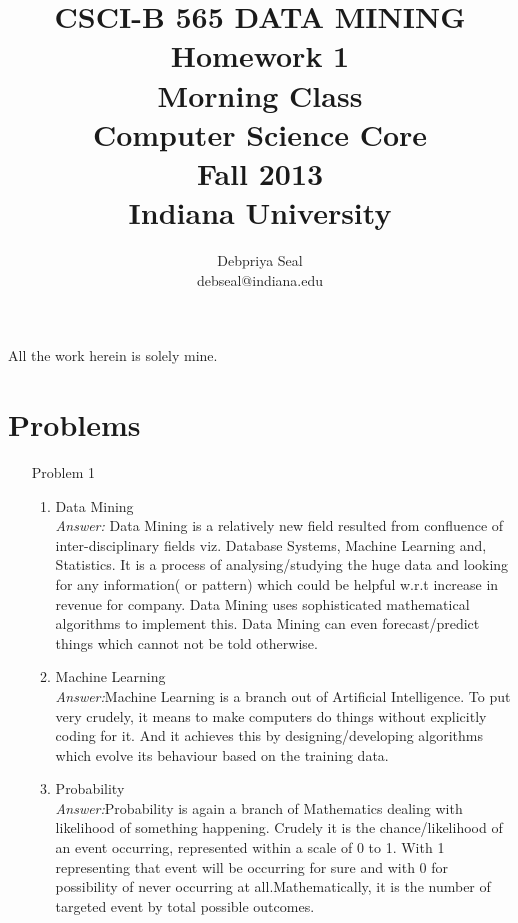 \documentclass{article}
\begin{document}
\title{ CSCI-B 565 DATA MINING \\
Homework 1 \\
Morning Class\\
Computer Science Core\\Fall 2013\\Indiana University}
\author{ Debpriya Seal\\ debseal@indiana.edu}
\maketitle
All the work herein is solely mine.
\section*{Problems}

\begin{enumerate}
	\item[Problem] 1  
		\begin{enumerate}
			
			\item Data Mining \\
			\emph{Answer:} Data Mining is a relatively new field resulted from confluence of inter-disciplinary fields viz. Database Systems, Machine Learning and, Statistics. It is a process of analysing/studying the huge data and looking for any information( or pattern) which could be helpful w.r.t increase in revenue for company. Data Mining uses sophisticated mathematical algorithms to implement this. Data Mining can even forecast/predict things which cannot not be told otherwise.
			
			\item Machine Learning \\
			\emph{Answer:}Machine Learning is a branch out of Artificial Intelligence. To put very crudely, it means to make computers do things without explicitly coding for it. And it achieves this by designing/developing algorithms which evolve its behaviour based on the training data.

			\item Probability \\
			\emph{Answer:}Probability is again a branch of Mathematics dealing with likelihood of something happening. Crudely it is the chance/likelihood of an event occurring, represented within a scale of 0 to 1. With 1 representing that event will be occurring for sure and with 0 for possibility of never occurring at all.Mathematically, it is the number of targeted event by total possible outcomes. 


\end{enumerate}
\end{enumerate}
\end{document}
